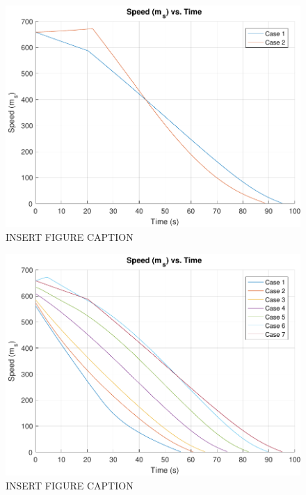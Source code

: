 \begin{figure}[H]
	\centering
	\begin{minipage}{4.5 in}
		\includegraphics[width=\linewidth]{Figures/spdatmovsvac.pdf}
		\caption{INSERT FIGURE CAPTION \label{fig:spdatmovsvac} }
	\end{minipage}
\end{figure}



\begin{figure}[H]
	\centering
	\begin{minipage}{4.5 in}
		\includegraphics[width=\linewidth]{Figures/spdpowatmo.pdf}
		\caption{INSERT FIGURE CAPTION \label{fig:spdpowatmo} }
	\end{minipage}
\end{figure}









